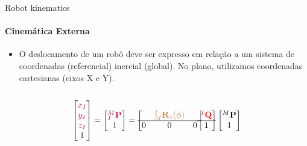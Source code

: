 \documentclass[aspectratio=169]{beamer}
\begin{document}
\begin{frame}{Robot kinematics}
    \framesubtitle{Cinemática Externa}
    \begin{itemize}
        \item O deslocamento de um robô deve ser expresso em relação a um sistema de
              coordenadas (referencial) inercial (global). No plano, utilizamos coordenadas
              cartesianas (eixos X e Y).
    \end{itemize}

    \begin{columns}
        \begin{column}[c]{0.5\textwidth}
            
        \end{column}
        \begin{column}[c]{0.5\textwidth}
            
        \end{column}
    \end{columns}

    \begin{equation*}
        \begin{bmatrix}
            \color{purple}{x_I} \\ \color{purple}{y_I} \\ \color{purple}{z_I}\\1
        \end{bmatrix}
        =
        \begin{bmatrix}
            \color{purple}{{}^M_I\mathbf{P}} \\ 1
        \end{bmatrix}
        =
        \left[
            \begin{matrix}
                  & \color{brown}{{}_M^I\mathbf{R}_z(\phi)} &   \\ \hline
                0 & 0                                       & 0 \\
            \end{matrix} \right.
            \left.
            \vline
            \begin{matrix}
                \color{red}{{}^I\mathbf{Q}} \\ \hline
                1
            \end{matrix} \right]
        \begin{bmatrix}
            {}^M\mathbf{P} \\
            1
        \end{bmatrix}
    \end{equation*}

\end{frame}
\end{document}
